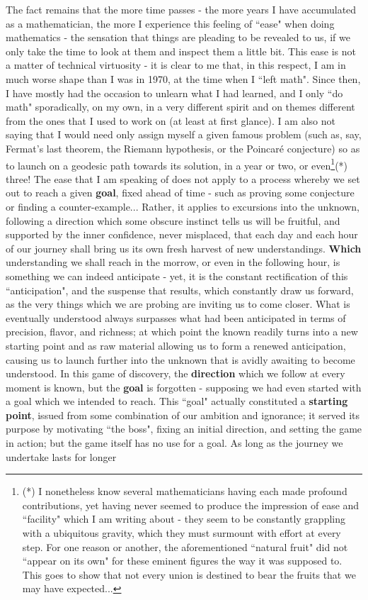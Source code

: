 The fact remains that the more time passes - the more years I have accumulated as a mathematician, the more I experience this feeling of ``ease" when doing mathematics - the sensation that things are pleading to be revealed to us, if we only take the time to look at them and inspect them a little bit. This ease is not a matter of technical virtuosity - it is clear to me that, in this respect, I am in much worse shape than I was in 1970, at the time when I ``left math". Since then, I have mostly had the occasion to unlearn what I had learned, and I only ``do math" sporadically, on my own, in a very different spirit and on themes different from the ones that I used to work on (at least at first glance). I am also not saying that I would need only assign myself a given famous problem (such as, say, Fermat's last theorem, the Riemann hypothesis, or the Poincar\'e conjecture) so as to launch on a geodesic path towards its solution, in a year or two, or even\footnote{(*) I nonetheless know several mathematicians having each made profound contributions, yet having never seemed to produce the impression of ease and ``facility" which I am writing about - they seem to be constantly grappling with a ubiquitous gravity, which they must surmount with effort at every step. For one reason or another, the aforementioned ``natural fruit" did not ``appear on its own" for these eminent figures the way it was supposed to. This goes to show that not every union is destined to bear the fruits that we may have expected...}(*) three! The ease that I am speaking of does not apply to a process whereby we set out to reach a given \textbf{goal}, fixed ahead of time - such as proving some conjecture or finding a counter-example... Rather, it applies to excursions into the unknown, following a direction which some obscure instinct tells us will be fruitful, and supported by the inner confidence, never misplaced, that each day and each hour of our journey shall bring us its own fresh harvest of new understandings. \textbf{Which} understanding we shall reach in the morrow, or even in the following hour, is something we can indeed anticipate - yet, it is the constant rectification of this ``anticipation", and the suspense that results, which constantly draw us forward, as the very things which we are probing are inviting us to come closer. What is eventually understood always surpasses what had been anticipated in terms of precision, flavor, and richness; at which point the known readily turns into a new starting point and as raw material allowing us to form a renewed anticipation, causing us to launch further into the unknown that is avidly awaiting to become understood. In this game of discovery, the \textbf{direction} which we follow at every moment is known, but the \textbf{goal} is forgotten - supposing we had even started with a goal which we intended to reach. This ``goal" actually constituted a \textbf{starting point}, issued from some combination of our ambition and ignorance; it served its purpose by motivating ``the boss", fixing an initial direction, and setting the game in action; but the game itself has no use for a goal. As long as the journey we undertake lasts for longer 